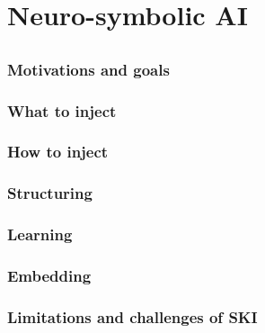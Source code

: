 
\chapter{Neuro-symbolic AI}
\label{ch:nesy-ai}

\section{}\label{sec:ski}

\subsection{Motivations and goals}\label{subsec:ski-motivations-and-goals}

\subsection{What to inject}\label{subsec:what-to-inject}

\subsection{How to inject}\label{subsec:how-to-inject}

\subsection{Structuring}\label{subsec:structuring}

\subsection{Learning}\label{subsec:learning}

\subsection{Embedding}\label{subsec:ski-embedding}

\subsection{Limitations and challenges of \Gls{SKI}}\label{subsec:limitations-and-challenges-of-ski}

